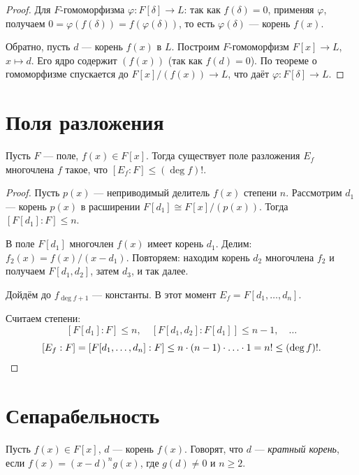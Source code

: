\begin{stmt}
\begin{proof}
        Для $F$-гомоморфизма $\varphi\colon F[\delta] \to L$: так как $f(\delta) = 0$, применяя $\varphi
        $, получаем $0 = \varphi(f(\delta)) = f(\varphi(\delta))$, то есть $\varphi(\delta)$ --- корень
        $f(x)$.

        Обратно, пусть $d$ --- корень $f(x)$ в $L$. Построим $F$-гомоморфизм $F[x] \to L$, $x \mapsto d
        $. Его ядро содержит $(f(x))$ (так как $f(d) = 0$). По теореме о гомоморфизме спускается до $F[x]
        /(f(x)) \to L$, что даёт $\varphi\colon F[\delta] \to L$.
    \end{proof}
\end{stmt}


\section{Поля разложения}

\begin{stmt}
    Пусть $F$ --- поле, $f(x) \in F[x]$. Тогда существует поле разложения $E_f$ многочлена $f$ такое,
    что $[E_f : F] \leq (\deg f)!$.

    \begin{proof}
        Пусть $p(x)$ --- неприводимый делитель $f(x)$ степени $n$. Рассмотрим $d_1$ --- корень $p(x)$ в расширении
        $F[d_1] \cong F[x]/(p(x))$. Тогда $[F[d_1] : F] \leq n$.

        В поле $F[d_1]$ многочлен $f(x)$ имеет корень $d_1$. Делим: $f_2(x) = f(x)/(x - d_1)$. Повторяем:
        находим корень $d_2$ многочлена $f_2$ и получаем $F[d_1, d_2]$, затем $d_3$, и так далее.

        Дойдём до $f_{\deg f + 1}$ --- константы. В этот момент $E_f = F[d_1, \dots, d_n]$.

        Считаем степени:
        \[
            [F[d_1] : F] \leq n, \quad [F[d_1, d_2] : F[d_1]] \leq n-1, \quad \dots
        \]
        \[
            [E_f : F] = [F[d_1, \dots, d_n] : F] \leq n \cdot (n-1) \cdot \ldots \cdot 1 = n! \leq (\deg f)
            !. \qedhere
        \]
    \end{proof}
\end{stmt}


\section{Сепарабельность}

\begin{definition}
    Пусть $f(x) \in F[x]$, $d$ --- корень $f(x)$. Говорят, что $d$ --- \emph{кратный корень}, если $f(x)
    = (x - d)^n g(x)$, где $g(d) \neq 0$ и $n \geq 2$.
\end{definition}

